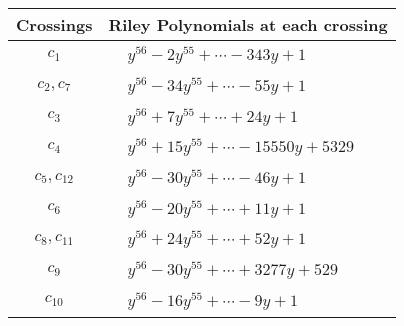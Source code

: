\documentclass[1p]{elsarticle_modified}
\theoremstyle{definition}
\begin{document}
\begin{tabular}{m{50pt}|m{274pt}}
Crossings & \hspace{64pt}Riley Polynomials at each crossing \\
\hline $$\begin{aligned}c_{1}\end{aligned}$$&$\begin{aligned}
&y^{56}-2 y^{55}+\cdots-343 y+1
\end{aligned}$\\
\hline $$\begin{aligned}c_{2},c_{7}\end{aligned}$$&$\begin{aligned}
&y^{56}-34 y^{55}+\cdots-55 y+1
\end{aligned}$\\
\hline $$\begin{aligned}c_{3}\end{aligned}$$&$\begin{aligned}
&y^{56}+7 y^{55}+\cdots+24 y+1
\end{aligned}$\\
\hline $$\begin{aligned}c_{4}\end{aligned}$$&$\begin{aligned}
&y^{56}+15 y^{55}+\cdots-15550 y+5329
\end{aligned}$\\
\hline $$\begin{aligned}c_{5},c_{12}\end{aligned}$$&$\begin{aligned}
&y^{56}-30 y^{55}+\cdots-46 y+1
\end{aligned}$\\
\hline $$\begin{aligned}c_{6}\end{aligned}$$&$\begin{aligned}
&y^{56}-20 y^{55}+\cdots+11 y+1
\end{aligned}$\\
\hline $$\begin{aligned}c_{8},c_{11}\end{aligned}$$&$\begin{aligned}
&y^{56}+24 y^{55}+\cdots+52 y+1
\end{aligned}$\\
\hline $$\begin{aligned}c_{9}\end{aligned}$$&$\begin{aligned}
&y^{56}-30 y^{55}+\cdots+3277 y+529
\end{aligned}$\\
\hline $$\begin{aligned}c_{10}\end{aligned}$$&$\begin{aligned}
&y^{56}-16 y^{55}+\cdots-9 y+1
\end{aligned}$\\
\hline
\end{tabular}\\~\\
\end{document}
